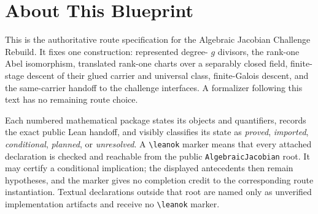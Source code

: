 
\chapter*{About This Blueprint}

This is the authoritative route specification for the Algebraic Jacobian
Challenge Rebuild.  It fixes one construction: represented degree-
\(g\) divisors, the rank-one Abel isomorphism, translated rank-one charts over
a separably closed field, finite-stage descent of their glued carrier and
universal class, finite-Galois descent, and the same-carrier handoff to the
challenge interfaces.  A formalizer following this text has no remaining
route choice.

Each numbered mathematical package states its objects and quantifiers, records
the exact public Lean handoff, and visibly classifies its state as
\emph{proved}, \emph{imported}, \emph{conditional}, \emph{planned}, or
\emph{unresolved}.  A \texttt{\textbackslash leanok} marker means that every
attached declaration is checked and reachable from the public
\texttt{AlgebraicJacobian} root.  It may certify a conditional implication;
the displayed antecedents then remain hypotheses, and the marker gives no
completion credit to the corresponding route instantiation.  Textual
declarations outside that root are named only as unverified implementation
artifacts and receive no \texttt{\textbackslash leanok} marker.









\appendix




